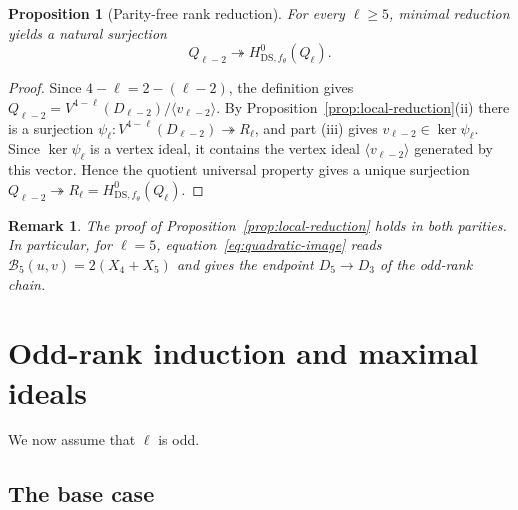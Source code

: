 \documentclass[11pt]{article}
\newtheorem{proposition}[theorem]{Proposition}
\newtheorem{remark}[theorem]{Remark}
\begin{document}
\begin{proposition}[Parity-free rank reduction]\label{prop:rank-reduction}
For every $\ell\ge5$, minimal reduction yields a natural surjection
$$
 Q_{\ell-2}\twoheadrightarrow
 H^0_{\mathrm{DS},f_\theta}(Q_\ell).
$$
\end{proposition}

\begin{proof}
Since $4-\ell=2-(\ell-2)$, the definition gives
$Q_{\ell-2}=V^{4-\ell}(D_{\ell-2})/\langle v_{\ell-2}\rangle$.
By Proposition~\ref{prop:local-reduction}\textup{(ii)} there is a surjection
$\psi_\ell:V^{4-\ell}(D_{\ell-2})\twoheadrightarrow R_\ell$, and part
\textup{(iii)} gives $v_{\ell-2}\in\ker\psi_\ell$.  Since
$\ker\psi_\ell$ is a vertex ideal, it contains the vertex ideal
$\langle v_{\ell-2}\rangle$ generated by this vector.  Hence the quotient
universal property gives a unique surjection
$Q_{\ell-2}\twoheadrightarrow R_\ell=H^0_{\mathrm{DS},f_\theta}(Q_\ell)$.
\end{proof}

\begin{remark}
The proof of Proposition~\ref{prop:local-reduction} holds in both
parities.  In particular, for $\ell=5$, equation~\eqref{eq:quadratic-image}
reads $\mathcal B_5(u,v)=2(X_4+X_5)$ and gives the endpoint
$D_5\to D_3$ of the odd-rank chain.
\end{remark}

\section{Odd-rank induction and maximal ideals}
\label{sec:odd}

We now assume that $\ell$ is odd.

\subsection{The base case}
\label{sec:base}
\end{document}
